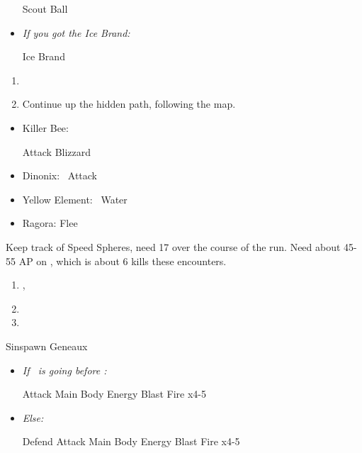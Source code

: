 \begin{equip}
	\begin{itemize}
		\wakkaf Scout Ball
		\item \textit{If you got the Ice Brand:}
		\begin{itemize}
			\tidusf Ice Brand
		\end{itemize}
	\end{itemize}
\end{equip}
\begin{enumerate}[resume]
	\item \formation{\tidus}{\yuna}{\wakka}
	\item Continue up the hidden path, following the map.
\end{enumerate}
\begin{encounters}
	\begin{itemize}
		\item Killer Bee:
			\begin{itemize}
				\wakkaf Attack
				\luluf Blizzard
			\end{itemize}
		\item Dinonix: \tidus\ Attack
		\item Yellow Element: \lulu\ Water
		\item Ragora: Flee
	\end{itemize}
	Keep track of Speed Spheres, need 17 over the course of the run. Need about 45-55 AP on \tidus, which is about 6 kills these encounters.
\end{encounters}
\begin{enumerate}[resume]
	\item\save,  \sd
	\item \formation{\tidus}{\yuna}{\wakka}
	\item \save
\end{enumerate}
\begin{battle}[3000]{Sinspawn Geneaux}
	\begin{itemize}
	\item \textit{If \tidus\ is going before \yuna:}
	\begin{itemize}
		\tidusf Attack Main Body
		\summon{\valefor}
		\valeforf Energy Blast \od
		\valeforf Fire x4-5
	\end{itemize}
	\item \textit{Else:}
	\begin{itemize}
		\switch{\yuna}{\kimahri}
		\kimahrif Defend
		\tidusf Attack Main Body
		\switch{anyone}{\yuna}
		\summon{\valefor}
		\valeforf Energy Blast \od
		\valeforf Fire x4-5
	\end{itemize}
	\end{itemize}
\end{battle}

